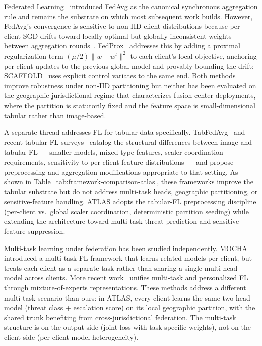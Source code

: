 \documentclass[conference]{IEEEtran}
\begin{document}
Federated Learning~\cite{mcmahan2017communication} introduced FedAvg as the canonical synchronous aggregation rule and remains the substrate on which most subsequent work builds. However, FedAvg's convergence is sensitive to non-IID client distributions because per-client SGD drifts toward locally optimal but globally inconsistent weights between aggregation rounds~\cite{li2020fedprox,karimireddy2020scaffold}. FedProx~\cite{li2020fedprox} addresses this by adding a proximal regularization term $(\mu/2)\|w - w^t\|^2$ to each client's local objective, anchoring per-client updates to the previous global model and provably bounding the drift; SCAFFOLD~\cite{karimireddy2020scaffold} uses explicit control variates to the same end. Both methods improve robustness under non-IID partitioning but neither has been evaluated on the geographic-jurisdictional regime that characterizes fusion-center deployments, where the partition is statutorily fixed and the feature space is small-dimensional tabular rather than image-based.

A separate thread addresses FL for tabular data specifically. TabFedAvg~\cite{wang2022tabular} and recent tabular-FL surveys~\cite{niu2023tabular} catalog the structural differences between image and tabular FL --- smaller models, mixed-type features, scaler-coordination requirements, sensitivity to per-client feature distributions --- and propose preprocessing and aggregation modifications appropriate to that setting. As shown in Table~\ref{tab:framework-comparison-atlas}, these frameworks improve the tabular substrate but do not address multi-task heads, geographic partitioning, or sensitive-feature handling. ATLAS adopts the tabular-FL preprocessing discipline (per-client vs.\ global scaler coordination, deterministic partition seeding) while extending the architecture toward multi-task threat prediction and sensitive-feature suppression.

Multi-task learning under federation has been studied independently. MOCHA~\cite{smith2017mocha} introduced a multi-task FL framework that learns related models per client, but treats each client as a separate task rather than sharing a single multi-head model across clients. More recent work~\cite{marfoq2021federated} unifies multi-task and personalized FL through mixture-of-experts representations. These methods address a different multi-task scenario than ours: in ATLAS, every client learns the same two-head model (threat class + escalation score) on its local geographic partition, with the shared trunk benefiting from cross-jurisdictional federation. The multi-task structure is on the output side (joint loss with task-specific weights), not on the client side (per-client model heterogeneity).
\end{document}
